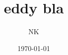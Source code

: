 \documentclass{beamer}
\begin{document}
\title{eddy bla}  
\author{NK}
\date{\today} 
\begin{frame}
\titlepage
\end{frame}











\end{document}
